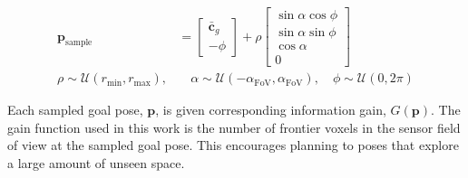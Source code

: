 \documentclass[letterpaper, 10 pt, conference]{ieeeconf}  %
\begin{document}
\begin{equation}
\begin{aligned}
  \bm{p}_{\text{sample}} &= \begin{bmatrix}
  \bar{\bm{c}}_g \\
  -\phi
  \end{bmatrix} + \rho \begin{bmatrix}
  \sin{\alpha}\cos{\phi} \\
  \sin{\alpha}\sin{\phi} \\
  \cos{\alpha} \\
  0
  \end{bmatrix} \\
  \rho \sim \mathcal{U}(r_{\text{min}}, r_{\text{max}}), &\quad \alpha \sim \mathcal{U}(-\alpha_{\text{FoV}},\alpha_{\text{FoV}}), \quad \phi \sim \mathcal{U}(0,2\pi)
\end{aligned}
\label{eq_polar_sample}
\end{equation}

Each sampled goal pose, $\bm{p}$, is given corresponding information gain, $G(\bm{p})$.  The gain function used in this work is the number of frontier voxels in the sensor field of view at the sampled goal pose.  This encourages planning to poses that explore a large amount of unseen space.
\end{document}
